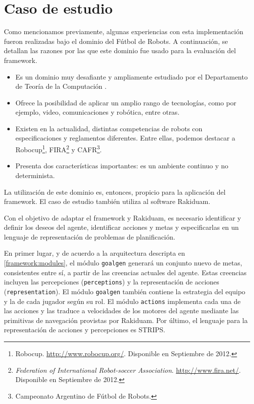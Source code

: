 \section{Caso de estudio}
	
	Como mencionamos previamente, algunas experiencias con esta
        implementaci\'on fueron re\-a\-li\-za\-das bajo el dominio
	del F\'utbol de Robots. A continuaci\'on, se detallan las razones por las que
	este dominio fue usado para la evaluaci\'on del framework.
	
	\begin{itemize}
	
	\item Es un dominio muy desafiante y ampliamente estudiado por
	el Departamento de Teor\'ia de la Computaci\'on \cite{gbraun:cecchi09:_un_enfoq_basad_en_compet}.
	
	\item Ofrece la posibilidad de aplicar un amplio rango
	de tecnolog\'ias, como por ejemplo, video, comunicaciones y
        rob\'otica, entre otras.
	
	\item Existen en la actualidad, distintas competencias de robots
	con especificaciones y reglamentos diferentes. Entre ellas,
	podemos destacar a
	Robocup\footnote{Robocup. \url{http://www.robocup.org/}. Disponible
        en Septiembre de 2012.}, 
        FIRA\footnote{\emph{Federation of International Robot-soccer
	Association}. \url{http://www.fira.net/}. Disponible en
          Septiembre de 2012.} 
        y CAFR\footnote{Campeonato Argentino de F\'utbol de Robots.}.
	
	\item Presenta dos caracter\'isticas importantes: es un
        ambiente continuo y no determinista.
	
	\end{itemize}
	
	La utilizaci\'on de este dominio es, entonces, propicio para la
	aplicaci\'on del framework. El caso de estudio tambi\'en utiliza
	al software Rakiduam.
	
	Con el objetivo de adaptar el framework y Rakiduam, es necesario
	identificar y definir los deseos del agente, identificar acciones y metas
	y especificarlas en un lenguaje de representaci\'on de problemas de planificaci\'on.
	
	En primer lugar, y de acuerdo a la arquitectura descripta en \ref{framework:modules},
	el m\'odulo \texttt{goalgen} ge\-ne\-ra\-r\'a un conjunto nuevo de metas, consistentes
	entre s\'i, a partir de las creencias actuales del
        agente. Estas creencias incluyen las percepciones (\texttt{perceptions}) y la
	representaci\'on de acciones (\texttt{representation}). El
	m\'odulo \texttt{goalgen} tambi\'en contiene la estrategia del
	equipo y la de cada jugador seg\'un su rol. El
	m\'odulo \texttt{actions} implementa cada una de las acciones
        y las traduce a velocidades de los motores del agente mediante
        las primitivas de navegaci\'on provistas por Rakiduam.
        Por \'ultimo, el lenguaje para la representaci\'on de acciones
	y percepciones es STRIPS.
	
